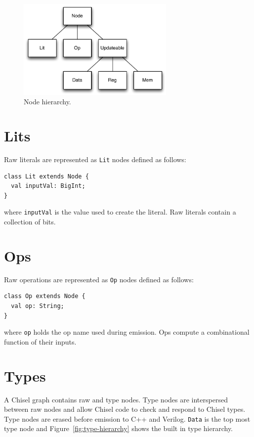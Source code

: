 \documentclass[10pt,twocolumn]{article}
\def\code#1{{\small\tt #1}}
\begin{document}
\begin{figure}[h]
\centering
\includegraphics[width=3in]{figs/node-hierarchy.pdf}
\caption{Node hierarchy.}
\label{fig:node-hierarchy}
\end{figure}

\section{Lits}

Raw literals are represented as \code{Lit} nodes defined as follows:

\begin{lstlisting}
class Lit extends Node {
  val inputVal: BigInt;
}
\end{lstlisting}

\noindent
where \code{inputVal} is the value used to create the literal.  
Raw literals contain a collection of bits.



\section{Ops}

Raw operations are represented as \code{Op} nodes defined as follows:

\begin{lstlisting}
class Op extends Node {
  val op: String;
}
\end{lstlisting}

\noindent
where \code{op} holds the op name used during emission.  
Ops compute a combinational function of their inputs.

\section{Types}

A Chisel graph contains raw and type nodes.  Type nodes are
interspersed between raw nodes and allow Chisel code to
check and respond to Chisel types.  Type nodes are erased before
emission to C++ and Verilog.  \code{Data} is the top most type node
and Figure~\ref{fig:type-hierarchy} shows the built in type hierarchy.
\end{document}
